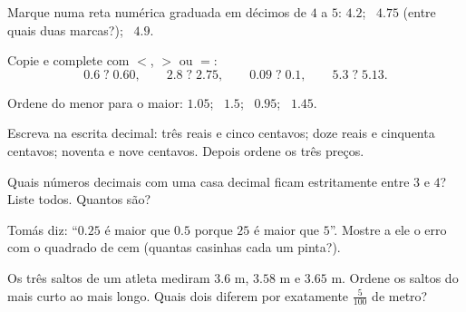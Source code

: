 \begin{exercise}[$\star$]\label{exo:g4:decimals:5}
Marque numa reta numérica graduada em décimos de $4$ a $5$:
$4.2$; \ $4.75$ (entre quais duas marcas?); \ $4.9$.
\end{exercise}

\begin{exercise}[$\star$]\label{exo:g4:decimals:6}
Copie e complete com $<$, $>$ ou $=$:
\[
0.6 \;?\; 0.60, \qquad
2.8 \;?\; 2.75, \qquad
0.09 \;?\; 0.1, \qquad
5.3 \;?\; 5.13 .
\]
\end{exercise}

\begin{exercise}[$\star$]\label{exo:g4:decimals:7}
Ordene do menor para o maior: $1.05$; \ $1.5$; \ $0.95$; \ $1.45$.
\end{exercise}

\begin{exercise}[$\star$]\label{exo:g4:decimals:8}
Escreva na escrita decimal: três reais e cinco centavos; doze reais
e cinquenta centavos; noventa e nove centavos. Depois ordene os três
preços.
\end{exercise}

\begin{exercise}[$\star$]\label{exo:g4:decimals:9}
Quais números decimais com uma casa decimal ficam estritamente entre
$3$ e $4$? Liste todos. Quantos são?
\end{exercise}

\begin{exercise}[$\star\star$]\label{exo:g4:decimals:10}
Tomás diz: ``$0.25$ é maior que $0.5$ porque $25$ é maior que $5$''.
Mostre a ele o erro com o quadrado de cem (quantas casinhas cada um
pinta?).
\end{exercise}

\begin{exercise}[$\star\star$]\label{exo:g4:decimals:11}
Os três saltos de um atleta mediram $3.6$ m, $3.58$ m e $3.65$ m.
Ordene os saltos do mais curto ao mais longo. Quais dois diferem por
exatamente $\frac{5}{100}$ de metro?
\end{exercise}
